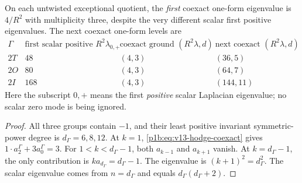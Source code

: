\documentclass[11pt]{article}
\begin{document}
\begin{corollary}
\label{p1b:cor:v13-hodge-gap-table}
On each untwisted exceptional quotient, the \emph{first} coexact
one-form eigenvalue is $4/R^2$ with multiplicity three, despite the
very different scalar first positive eigenvalues. The next coexact
one-form levels are
\begin{equation}
\label{p1b:eq:v13-hodge-gaps}
 \begin{array}{c|c|c|c}
\Gamma & \text{first scalar positive }R^2\lambda_{0,+}
& \text{coexact ground }(R^2\lambda,d)
& \text{next coexact }(R^2\lambda,d)\\\hline
2T&48&(4,3)&(36,5)\\
2O&80&(4,3)&(64,7)\\
2I&168&(4,3)&(144,11)
\end{array}
\end{equation}
Here the subscript $0,+$ means the first \emph{positive} scalar
Laplacian eigenvalue; no scalar zero mode is being ignored.
\end{corollary}
\begin{proof}
All three groups contain $-1$, and their least positive invariant
symmetric-power degree is $d_\Gamma=6,8,12$.  At $k=1$,
\eqref{p1b:eq:v13-hodge-coexact} gives
$1\cdot a_2^\Gamma+3a_0^\Gamma=3$.
For $1<k<d_\Gamma-1$, both $a_{k-1}$ and $a_{k+1}$
vanish.  At $k=d_\Gamma-1$, the only contribution is
$k a_{d_\Gamma}=d_\Gamma-1$.  The eigenvalue is
$(k+1)^2=d_\Gamma^2$.  The scalar eigenvalue comes from
$n=d_\Gamma$ and equals $d_\Gamma(d_\Gamma+2)$.
\end{proof}
\end{document}
